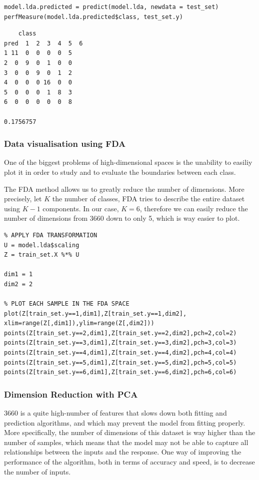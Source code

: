 \documentclass[]{report}
\begin{document}
\begin{lstlisting}
model.lda.predicted = predict(model.lda, newdata = test_set)
perfMeasure(model.lda.predicted$class, test_set.y)
\end{lstlisting}

\begin{verbatim}
    class
pred  1  2  3  4  5  6
1 11  0  0  0  0  5
2  0  9  0  1  0  0
3  0  0  9  0  1  2
4  0  0  0 16  0  0
5  0  0  0  1  8  3
6  0  0  0  0  0  8

0.1756757
\end{verbatim}

\subsubsection{Data visualisation using FDA}
One of the biggest problems of high-dimensional spaces is the unability to easiliy plot it in order to study and to evaluate the boundaries between each class.

The FDA method allows us to greatly reduce the number of dimensions. More precisely, let $K$ the number of classes, FDA tries to describe the entire dataset using $K-1$ components. In our case, $K = 6$, therefore we can easily reduce the number of dimensions from 3660 down to only 5, which is way easier to plot.

\begin{lstlisting}
% APPLY FDA TRANSFORMATION
U = model.lda$scaling
Z = train_set.X %*% U

dim1 = 1
dim2 = 2

% PLOT EACH SAMPLE IN THE FDA SPACE
plot(Z[train_set.y==1,dim1],Z[train_set.y==1,dim2], xlim=range(Z[,dim1]),ylim=range(Z[,dim2]))
points(Z[train_set.y==2,dim1],Z[train_set.y==2,dim2],pch=2,col=2)
points(Z[train_set.y==3,dim1],Z[train_set.y==3,dim2],pch=3,col=3)
points(Z[train_set.y==4,dim1],Z[train_set.y==4,dim2],pch=4,col=4)
points(Z[train_set.y==5,dim1],Z[train_set.y==5,dim2],pch=5,col=5)
points(Z[train_set.y==6,dim1],Z[train_set.y==6,dim2],pch=6,col=6)
\end{lstlisting}

\subsubsection{Dimension Reduction with PCA}
3660 is a quite high-number of features that slows down both fitting and prediction algorithms, and which may prevent the model from fitting properly. More specifically, the number of dimensions of this dataset is way higher than the number of samples, which means that the model may not be able to capture all relationships between the inputs and the response. One way of improving the performance of the algorithm, both in terms of accuracy and speed, is to decrease the number of inputs.
\end{document}
